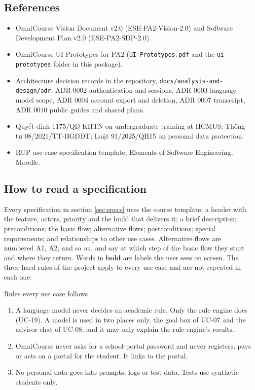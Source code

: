 \documentclass{article}
\newcommand{\st}[1]{\textbf{#1}}%
\begin{document}
\subsection{References}
\begin{itemize}
  \item OmniCourse Vision Document v2.0 (ESE-PA2-Vision-2.0) and Software Development Plan v2.0 (ESE-PA2-SDP-2.0).
  \item OmniCourse UI Prototypes for PA2 (\texttt{UI-Prototypes.pdf} and the \texttt{ui-prototypes} folder in this package).
  \item Architecture decision records in the repository, \texttt{docs/analysis-and-design/adr}: ADR 0002 authentication
        and sessions, ADR 0003 language-model scope, ADR 0004 account export and deletion, ADR 0007 transcript, ADR 0010
        public guides and shared plans.
  \item Quyết định 1175/QĐ-KHTN on undergraduate training at HCMUS; Thông tư 08/2021/TT-BGDĐT; Luật 91/2025/QH15 on
        personal data protection.
  \item RUP use-case specification template, Elements of Software Engineering, Moodle.
\end{itemize}

\subsection{How to read a specification}
Every specification in section \ref{sec:specs} uses the course template: a header with the feature, actors, priority and
the build that delivers it; a brief description; preconditions; the basic flow; alternative flows; postconditions; special
requirements; and relationships to other use cases. Alternative flows are numbered A1, A2, and so on, and say at which step
of the basic flow they start and where they return. Words in \st{bold} are labels the user sees on screen. The three hard
rules of the project apply to every use case and are not repeated in each one:

\begin{ocnote}{Rules every use case follows}
\begin{enumerate}
  \item A language model never decides an academic rule. Only the rule engine does (UC-19). A model is used in two places
        only, the goal box of UC-07 and the advisor chat of UC-08, and it may only explain the rule engine's results.
  \item OmniCourse never asks for a school-portal password and never registers, pays or acts on a portal for the student.
        It links to the portal.
  \item No personal data goes into prompts, logs or test data. Tests use synthetic students only.
\end{enumerate}
\end{ocnote}
\end{document}
